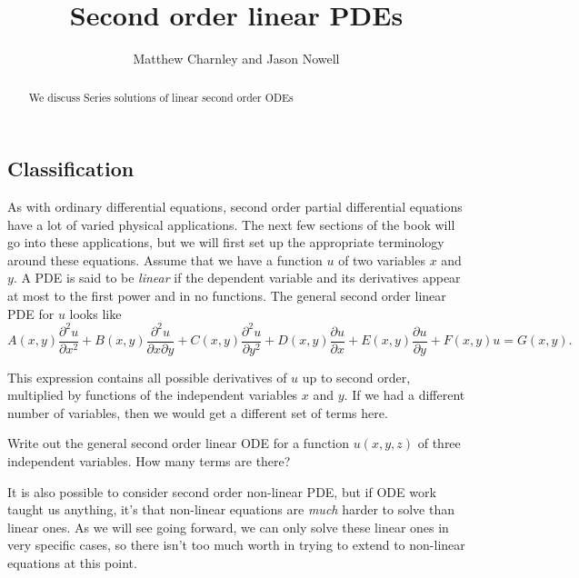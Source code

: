 \documentclass{ximera}
\title{Second order linear PDEs}
\author{Matthew Charnley and Jason Nowell}
\begin{document}
\begin{abstract}
    We discuss Series solutions of linear second order ODEs
\end{abstract}
\maketitle

\label{secondpde:section}


\subsection{Classification}

As with ordinary differential equations, second order partial differential equations have a lot of varied physical applications. The next few sections of the book will go into these applications, but we will first set up the appropriate terminology around these equations. Assume that we have a function $u$ of two variables $x$ and $y$. A PDE is said to be \emph{linear} if the dependent
variable and its derivatives appear at most to the first power and in no
functions. The general second order linear PDE for $u$ looks like
\[ 
    A(x,y)\frac{\partial^2 u}{\partial x^2} + B(x,y) \frac{\partial^2u}{\partial x \partial y} + C(x,y) \frac{\partial ^2 u}{\partial y^2} + D(x,y) \frac{\partial u}{\partial x} + E(x,y) \frac{\partial u}{\partial y} + F(x,y) u = G(x,y). 
\]

This expression contains all possible derivatives of $u$ up to second order, multiplied by functions of the independent variables $x$ and $y$. If we had a different number of variables, then we would get a different set of terms here.

\begin{exercise}
    Write out the general second order linear ODE for a function $u(x,y,z)$ of three independent variables. How many terms are there?
\end{exercise}

It is also possible to consider second order non-linear PDE, but if ODE work taught us anything, it's that non-linear equations are \emph{much} harder to solve than linear ones. As we will see going forward, we can only solve these linear ones in very specific cases, so there isn't too much worth in trying to extend to non-linear equations at this point.
\end{document}
